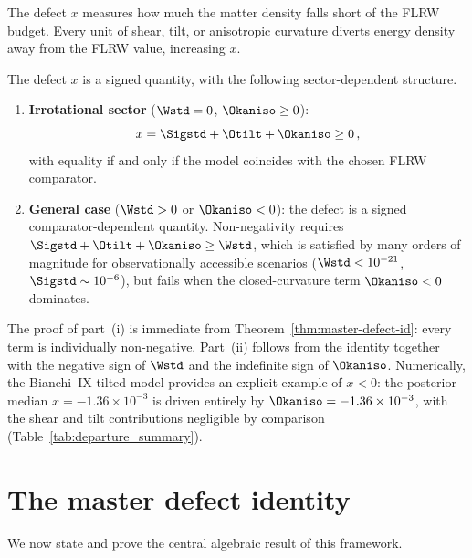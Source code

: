 The defect $x$ measures how much the matter density falls short
of the FLRW budget.  Every unit of shear, tilt, or anisotropic
curvature diverts energy density away from the FLRW value,
increasing $x$.

\begin{proposition}\label{prop:x-sign}
The defect $x$ is a signed quantity, with the following sector-dependent structure.
\begin{enumerate}
\item[\emph{(i)}]
  \textbf{Irrotational sector} ($\Wstd = 0$,\;
  $\Okaniso \geq 0$):
  \begin{equation}\label{eq:x-irrot-pos}
  x = \Sigstd + \Otilt + \Okaniso \geq 0\,,
  \end{equation}
  with equality if and only if the model coincides with the
  chosen FLRW comparator.

\item[\emph{(ii)}]
  \textbf{General case} ($\Wstd > 0$ or $\Okaniso < 0$):
  the defect is a signed comparator-dependent quantity.
  Non-negativity requires
  $\Sigstd + \Otilt + \Okaniso \geq \Wstd$, which is
  satisfied by many orders of magnitude for observationally
  accessible scenarios
  ($\Wstd < 10^{-21}$, $\Sigstd \sim 10^{-6}$), but fails
  when the closed-curvature term $\Okaniso < 0$ dominates.
\end{enumerate}
\end{proposition}

\noindent
The proof of part~(i) is immediate from
Theorem~\ref{thm:master-defect-id}: every term is individually
non-negative.  Part~(ii) follows from the identity together with
the negative sign of $\Wstd$ and the indefinite sign of
$\Okaniso$.  Numerically, the Bianchi~IX tilted model provides
an explicit example of $x < 0$: the posterior median
$x = -1.36 \times 10^{-3}$ is driven entirely by
$\Okaniso = -1.36 \times 10^{-3}$, with the shear and tilt
contributions negligible by comparison
(Table~\ref{tab:departure_summary}).


\section{The master defect identity}\label{sec:master-id}

We now state and prove the central algebraic result of this
framework.

